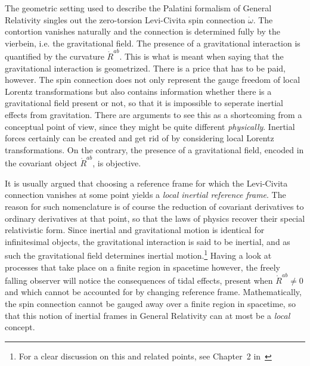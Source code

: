\documentclass[11pt]{article}
\begin{document}
\begin{remark}
	The geometric setting used to describe the Palatini formalism 
	of General Relativity singles out the zero-torsion Levi-Civita 
	spin connection $\mathring{\omega}$. The contortion vanishes 
	naturally and the connection is determined fully by the 
	vierbein, i.e. the gravitational field. The presence of a 
	gravitational interaction is quantified by the curvature 
	$\mathring{R}^{ab}$. This is what is meant when saying that 
	the gravitational interaction is geometrized.  There is a 
	price that has to be paid, however. The spin connection does 
	not only represent the gauge freedom of local Lorentz 
	transformations but also contains information whether there is 
	a gravitational field present or not, so that it is impossible 
	to seperate inertial effects from gravitation. There are 
	arguments to see this as a shortcoming from a conceptual point 
	of view, since they might be quite different 
	\emph{physically}.  Inertial forces certainly can be created 
	and get rid of by considering local Lorentz transformations.  
	On the contrary, the presence of a gravitational field, 
	encoded in the covariant object $\mathring{R}^{ab}$, is 
	objective.

	It is usually argued that choosing a reference frame for which 
	the Levi-Civita connection vanishes at some point yields a 
	\emph{local inertial reference frame}.  The reason for such 
	nomenclature is of course the reduction of covariant 
	derivatives to ordinary derivatives at that point, so that the 
	laws of physics recover their special relativistic form.  
	Since inertial and gravitational motion is identical for 
	infinitesimal objects, the gravitational interaction is said 
	to be inertial, and as such the gravitational field determines 
	inertial motion.\footnote{For a clear discussion on this and 
		related points, see Chapter~2 in~\cite{rovelli2004-QG}} 
	Having a look at processes that take place on a finite region 
	in spacetime however, the freely falling observer will notice 
	the consequences of tidal effects, present when 
	$\mathring{R}^{ab} \neq 0$ and which cannot be accounted for 
	by changing reference frame. Mathematically, the spin 
	connection cannot be gauged away over a finite region in 
	spacetime, so that this notion of inertial frames in General 
	Relativity can at most be a \emph{local} concept.	


\end{remark}
\end{document}
